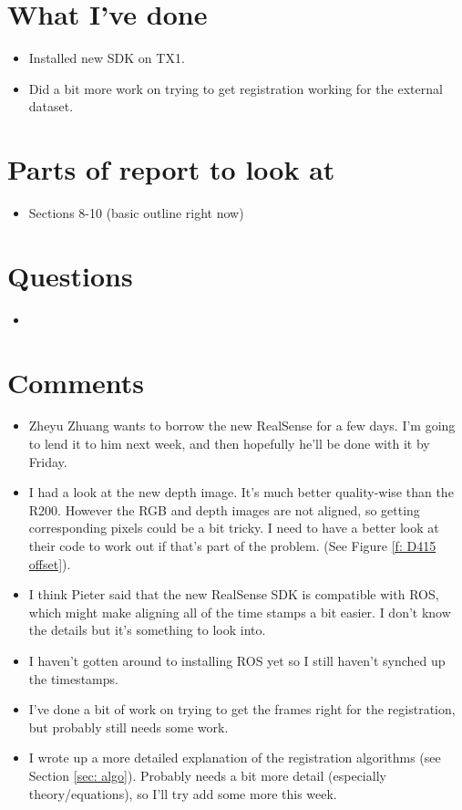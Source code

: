 \documentclass[12pt,a4paper]{article}
\begin{document}
\author{Katrina Ashton}


\pagestyle{fancy}
\fancyhf{}
\rhead{\thepage}

\section{What I've done}
\begin{itemize}
\item Installed new SDK on TX1.
\item Did a bit more work on trying to get registration working for the external dataset.
\end{itemize}

\section{Parts of report to look at}
\begin{itemize}
\item{Sections 8-10 (basic outline right now)}
\end{itemize}

\section{Questions}
\begin{itemize}
\item
\end{itemize}

\section{Comments}
\begin{itemize}
\item Zheyu Zhuang wants to borrow the new RealSense for a few days. I'm going to lend it to him next week, and then hopefully he'll be done with it by Friday.
\item I had a look at the new depth image. It's much better quality-wise than the R200. However the RGB and depth images are not aligned, so getting corresponding pixels could be a bit tricky. I need to have a better look at their code to work out if that's part of the problem. (See Figure \ref{f: D415 offset}).
\item I think Pieter said that the new RealSense SDK is compatible with ROS, which might make aligning all of the time stamps a bit easier. I don't know the details but it's something to look into.
\item I haven't gotten around to installing ROS yet so I still haven't synched up the timestamps.
\item I've done a bit of work on trying to get the frames right for the registration, but probably still needs some work. 
\item I wrote up a more detailed explanation of the registration algorithms (see Section \ref{sec: algo}). Probably needs a bit more detail (especially theory/equations), so I'll try add some more this week.
\end{itemize}
\end{document}
